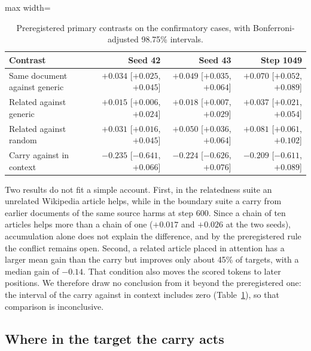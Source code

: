\documentclass[12pt,a4paper]{report}
\begin{document}
\begin{table}[H]
  \centering
  \small
  \begin{adjustbox}{max width=\linewidth}
  \begin{tabular}{lrrr}
    \toprule
    Contrast & Seed 42 & Seed 43 & Step 1049 \\
    \midrule
    Same document against generic & $+0.034$ {\footnotesize [$+0.025$, $+0.045$]} & $+0.049$ {\footnotesize [$+0.035$, $+0.064$]} & $+0.070$ {\footnotesize [$+0.052$, $+0.089$]} \\
    Related against generic & $+0.015$ {\footnotesize [$+0.006$, $+0.024$]} & $+0.018$ {\footnotesize [$+0.007$, $+0.029$]} & $+0.037$ {\footnotesize [$+0.021$, $+0.054$]} \\
    Related against random & $+0.031$ {\footnotesize [$+0.016$, $+0.045$]} & $+0.050$ {\footnotesize [$+0.036$, $+0.064$]} & $+0.081$ {\footnotesize [$+0.061$, $+0.102$]} \\
    Carry against in context & $-0.235$ {\footnotesize [$-0.641$, $+0.066$]} & $-0.224$ {\footnotesize [$-0.626$, $+0.076$]} & $-0.209$ {\footnotesize [$-0.611$, $+0.089$]} \\
    \bottomrule
  \end{tabular}
  \end{adjustbox}
    \caption{Preregistered primary contrasts on the confirmatory cases, with Bonferroni-adjusted 98.75\% intervals.}
  \label{tab-primary}
\end{table}

Two results do not fit a simple account. First, in the relatedness suite an unrelated Wikipedia article helps, while in the boundary suite a carry from earlier documents of the same source harms at step 600. Since a chain of ten articles helps more than a chain of one ($+0.017$ and $+0.026$ at the two seeds), accumulation alone does not explain the difference, and by the preregistered rule the conflict remains open. Second, a related article placed in attention has a larger mean gain than the carry but improves only about 45\% of targets, with a median gain of $-0.14$. That condition also moves the scored tokens to later positions. We therefore draw no conclusion from it beyond the preregistered one: the interval of the carry against in context includes zero (Table~\ref{tab-primary}), so that comparison is inconclusive.

\subsection{Where in the target the carry acts}
\label{sec-position}
\end{document}
